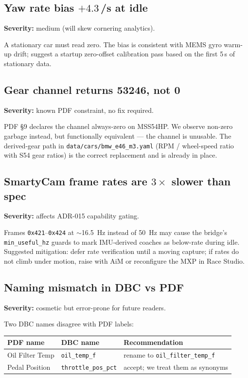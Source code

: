 \documentclass[11pt,a4paper]{article}
\newcommand{\hex}[1]{\texttt{0x#1}}
\begin{document}
\subsection{Yaw rate bias $+4.3$\,\textdegree/s at idle}

\textbf{Severity:} medium (will skew cornering analytics).

A stationary car must read zero. The bias is consistent with MEMS
gyro warm-up drift; suggest a startup zero-offset calibration pass
based on the first 5\,s of stationary data.

\subsection{Gear channel returns 53246, not 0}

\textbf{Severity:} known PDF constraint, no fix required.

PDF \S 9 declares the channel always-zero on MSS54HP. We observe
non-zero garbage instead, but functionally equivalent --- the channel
is unusable. The derived-gear path in
\texttt{data/cars/bmw\_e46\_m3.yaml} (RPM / wheel-speed ratio with
S54 gear ratios) is the correct replacement and is already in place.

\subsection{SmartyCam frame rates are $3\times$ slower than spec}

\textbf{Severity:} affects ADR-015 capability gating.

Frames \hex{421}--\hex{424} at $\sim$\SI{16.5}{Hz} instead of
\SI{50}{Hz} may cause the bridge's \texttt{min\_useful\_hz} guards
to mark IMU-derived coaches as below-rate during idle. Suggested
mitigation: defer rate verification until a moving capture; if rates
do not climb under motion, raise with AiM or reconfigure the MXP in
Race Studio.

\subsection{Naming mismatch in DBC vs PDF}

\textbf{Severity:} cosmetic but error-prone for future readers.

Two DBC names disagree with PDF labels:

\begin{center}
\begin{tabular}{@{}lll@{}}
\toprule
PDF name & DBC name & Recommendation \\
\midrule
Oil Filter Temp & \texttt{oil\_temp\_f}        & rename to \texttt{oil\_filter\_temp\_f} \\
Pedal Position  & \texttt{throttle\_pos\_pct}  & accept; we treat them as synonyms \\
\bottomrule
\end{tabular}
\end{center}
\end{document}
